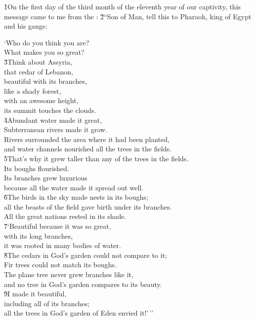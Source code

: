 \v{1}On the first day of the third month of the eleventh year of our captivity, this message came to me from the : \v{2}``Son of Man, tell this to Pharaoh, king of Egypt and his gangs:

\begin{poetry}
\poeml `Who do you think you are? \\
\poemll    What makes you so great? \\
\poeml \v{3}Think about Assyria, \\
\poemll    that cedar of Lebanon, \\
\poeml beautiful with its branches, \\
\poemll    like a shady forest, \\
\poeml with an awesome height, \\
\poemll    its summit touches the clouds. \\
\poeml \v{4}Abundant water made it great, \\
\poemll    Subterranean rivers made it grow. \\
\poeml Rivers surrounded the area where it had been planted, \\
\poemll    and water channels nourished all the trees in the fields. \\
\poeml \v{5}That's why it grew taller than any of the trees in the fields. \\
\poemll    Its boughs flourished. \\
\poeml Its branches grew luxurious \\
\poemll    because all the water made it spread out well. \\
\poeml \v{6}The birds in the sky made nests in its boughs; \\
\poemll    all the beasts of the field gave birth under its branches. \\
\poemlll       All the great nations rested in its shade. \\
\poeml \v{7}`Beautiful because it was so great, \\
\poemll    with its long branches, \\
\poemlll       it was rooted in many bodies of water. \\
\poeml \v{8}The cedars in God's garden could not compare to it; \\
\poemll    Fir trees could not match its boughs. \\
\poeml The plane tree never grew branches like it, \\
\poemll    and no tree in God's garden compares to its beauty. \\
\poeml \v{9}I made it beautiful, \\
\poemll    including all of its branches; \\
\poeml all the trees in God's garden of Eden envied it!'\,''
\end{poetry}

